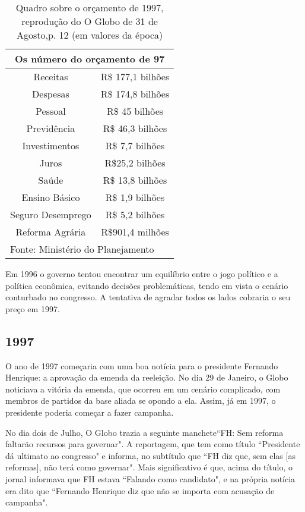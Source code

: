 \documentclass{article}
\begin{document}
\begin{table}[h]
\begin{center}
\begin{tabular}[c]{|c c|}
\multicolumn{2}{c}{\large\textbf{Os número do orçamento de 97}}\\ \hline \normalsize
 Receitas & R\$ 177,1 bilhões   \\ \hline
 Despesas & R\$ 174,8 bilhões  \\ \hline
 Pessoal &  R\$ 45 bilhões  \\ \hline
 Previdência & R\$ 46,3 bilhões   \\ \hline
 Investimentos & R\$ 7,7 bilhões  \\ \hline
 Juros &  R\$25,2 bilhões \\ \hline
 Saúde & R\$ 13,8 bilhões \\ \hline
 Ensino Básico &  R\$ 1,9 bilhões \\ \hline
 Seguro Desemprego & R\$ 5,2 bilhões  \\ \hline
 Reforma Agrária &  R\$901,4 milhões \\ \hline
\multicolumn{2}{l}{Fonte: Ministério do Planejamento} \\
\end{tabular}
\caption{Quadro sobre o orçamento de 1997, reprodução do O Globo de 31 de Agosto,p. 12 (em valores da época)}
\end{center}
\end{table}

Em 1996 o governo tentou encontrar um equilíbrio entre o jogo político e a política econômica, evitando decisões problemáticas, tendo em vista o cenário conturbado no congresso. A tentativa de agradar todos os lados cobraria o seu preço em 1997.  

\subsection*{1997}

O ano de 1997 começaria com uma boa notícia para o presidente Fernando Henrique: a aprovação da emenda da reeleição. No dia 29 de Janeiro, o Globo noticiava a vitória da emenda, que ocorreu em um cenário complicado, com membros de partidos da base aliada se opondo a ela. Assim, já em 1997, o presidente poderia começar a fazer campanha.

No dia dois de Julho, O Globo trazia a seguinte manchete``FH: Sem reforma faltarão recursos para governar". A reportagem, que tem como título ``Presidente dá ultimato ao congresso" e informa, no subtítulo que ``FH diz que, sem elas [as reformas], não terá como governar". Mais significativo é que, acima do título, o jornal informava que FH estava ``Falando como candidato", e na própria notícia era dito que ``Fernando Henrique diz que não se importa com acusação de campanha".
\end{document}
